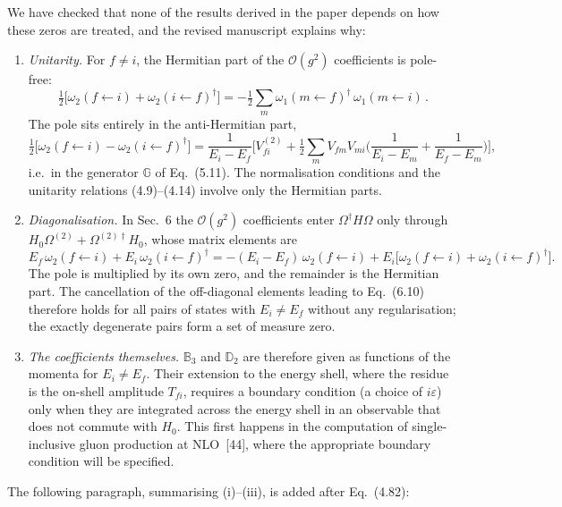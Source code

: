 \documentclass[11pt,a4paper]{article}
\newcommand{\eq}[1]{Eq.~(#1)}
\begin{document}
We have checked that none of the results derived in the paper depends on how these zeros are treated, and the revised manuscript explains why:
\begin{enumerate}[label=(\roman*),leftmargin=22pt,itemsep=3pt]
\item \emph{Unitarity.} For $f\neq i$, the Hermitian part of the $\mathcal O(g^2)$ coefficients is pole-free:
\[
\tfrac12\big[\omega_2(f\!\leftarrow\! i)+\omega_2(i\!\leftarrow\! f)^\dagger\big]=-\tfrac12\sum_m\omega_1(m\!\leftarrow\! f)^\dagger\,\omega_1(m\!\leftarrow\! i)\,.
\]
The pole sits entirely in the anti-Hermitian part,
\[
\tfrac12\big[\omega_2(f\!\leftarrow\! i)-\omega_2(i\!\leftarrow\! f)^\dagger\big]=\frac{1}{E_i-E_f}\Big[V^{(2)}_{fi}+\tfrac12\sum_m V_{fm}V_{mi}\Big(\frac{1}{E_i-E_m}+\frac{1}{E_f-E_m}\Big)\Big],
\]
i.e.\ in the generator $\mathbb G$ of \eq{5.11}. The normalisation conditions and the unitarity relations (4.9)--(4.14) involve only the Hermitian parts.
\item \emph{Diagonalisation.} In Sec.~6 the $\mathcal O(g^2)$ coefficients enter $\Omega^\dagger H\Omega$ only through $H_0\Omega^{(2)}+\Omega^{(2)\dagger}H_0$, whose matrix elements are
\[
E_f\,\omega_2(f\!\leftarrow\! i)+E_i\,\omega_2(i\!\leftarrow\! f)^\dagger=-(E_i-E_f)\,\omega_2(f\!\leftarrow\! i)+E_i\big[\omega_2(f\!\leftarrow\! i)+\omega_2(i\!\leftarrow\! f)^\dagger\big].
\]
The pole is multiplied by its own zero, and the remainder is the Hermitian part. The cancellation of the off-diagonal elements leading to Eq.~(6.10) therefore holds for all pairs of states with $E_i\neq E_f$ without any regularisation; the exactly degenerate pairs form a set of measure zero.
\item \emph{The coefficients themselves.} $\mathbb B_3$ and $\mathbb D_2$ are therefore given as functions of the momenta for $E_i\neq E_f$. Their extension to the energy shell, where the residue is the on-shell amplitude $T_{fi}$, requires a boundary condition (a choice of $i\varepsilon$) only when they are integrated across the energy shell in an observable that does not commute with $H_0$. This first happens in the computation of single-inclusive gluon production at NLO~[44], where the appropriate boundary condition will be specified.
\end{enumerate}
The following paragraph, summarising (i)--(iii), is added after Eq.~(4.82):
\end{document}
